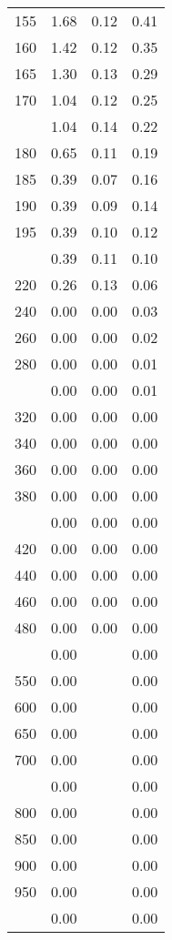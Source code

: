 \begin{table}[ht]
\begin{tabular}{lccc}
  155 & 1.68 & 0.12 & 0.41 \\ 
  160 & 1.42 & 0.12 & 0.35 \\ 
  165 & 1.30 & 0.13 & 0.29 \\ 
  170 & 1.04 & 0.12 & 0.25 \\ 
   \addlinespace
175 & 1.04 & 0.14 & 0.22 \\ 
  180 & 0.65 & 0.11 & 0.19 \\ 
  185 & 0.39 & 0.07 & 0.16 \\ 
  190 & 0.39 & 0.09 & 0.14 \\ 
  195 & 0.39 & 0.10 & 0.12 \\ 
   \addlinespace
200 & 0.39 & 0.11 & 0.10 \\ 
  220 & 0.26 & 0.13 & 0.06 \\ 
  240 & 0.00 & 0.00 & 0.03 \\ 
  260 & 0.00 & 0.00 & 0.02 \\ 
  280 & 0.00 & 0.00 & 0.01 \\ 
   \addlinespace
300 & 0.00 & 0.00 & 0.01 \\ 
  320 & 0.00 & 0.00 & 0.00 \\ 
  340 & 0.00 & 0.00 & 0.00 \\ 
  360 & 0.00 & 0.00 & 0.00 \\ 
  380 & 0.00 & 0.00 & 0.00 \\ 
   \addlinespace
400 & 0.00 & 0.00 & 0.00 \\ 
  420 & 0.00 & 0.00 & 0.00 \\ 
  440 & 0.00 & 0.00 & 0.00 \\ 
  460 & 0.00 & 0.00 & 0.00 \\ 
  480 & 0.00 & 0.00 & 0.00 \\ 
   \addlinespace
500 & 0.00 &  & 0.00 \\ 
  550 & 0.00 &  & 0.00 \\ 
  600 & 0.00 &  & 0.00 \\ 
  650 & 0.00 &  & 0.00 \\ 
  700 & 0.00 &  & 0.00 \\ 
   \addlinespace
750 & 0.00 &  & 0.00 \\ 
  800 & 0.00 &  & 0.00 \\ 
  850 & 0.00 &  & 0.00 \\ 
  900 & 0.00 &  & 0.00 \\ 
  950 & 0.00 &  & 0.00 \\ 
   \addlinespace
1000 & 0.00 &  & 0.00 \\ 
   \bottomrule
\end{tabular}
\end{table}
